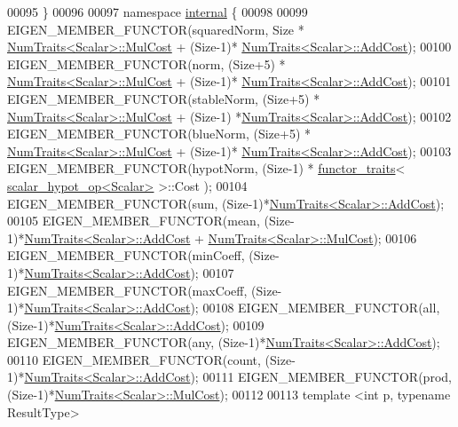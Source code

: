 \begin{DoxyCode}
00095 \textcolor{preprocessor}{  \}}
00096 
00097 \textcolor{keyword}{namespace }\hyperlink{namespaceinternal}{internal} \{
00098 
00099 EIGEN\_MEMBER\_FUNCTOR(squaredNorm, Size * \hyperlink{group___core___module_struct_eigen_1_1_num_traits}{NumTraits<Scalar>::MulCost} + (Size-1)*
      \hyperlink{group___core___module_struct_eigen_1_1_num_traits}{NumTraits<Scalar>::AddCost});
00100 EIGEN\_MEMBER\_FUNCTOR(norm, (Size+5) * \hyperlink{group___core___module_struct_eigen_1_1_num_traits}{NumTraits<Scalar>::MulCost} + (Size-1)*
      \hyperlink{group___core___module_struct_eigen_1_1_num_traits}{NumTraits<Scalar>::AddCost});
00101 EIGEN\_MEMBER\_FUNCTOR(stableNorm, (Size+5) * \hyperlink{group___core___module_struct_eigen_1_1_num_traits}{NumTraits<Scalar>::MulCost} + (Size-1)
      *\hyperlink{group___core___module_struct_eigen_1_1_num_traits}{NumTraits<Scalar>::AddCost});
00102 EIGEN\_MEMBER\_FUNCTOR(blueNorm, (Size+5) * \hyperlink{group___core___module_struct_eigen_1_1_num_traits}{NumTraits<Scalar>::MulCost} + (Size-1)*
      \hyperlink{group___core___module_struct_eigen_1_1_num_traits}{NumTraits<Scalar>::AddCost});
00103 EIGEN\_MEMBER\_FUNCTOR(hypotNorm, (Size-1) * \hyperlink{struct_eigen_1_1internal_1_1functor__traits}{functor\_traits}<
      \hyperlink{struct_eigen_1_1internal_1_1scalar__hypot__op}{scalar\_hypot\_op<Scalar>} >::Cost );
00104 EIGEN\_MEMBER\_FUNCTOR(sum, (Size-1)*\hyperlink{group___core___module_struct_eigen_1_1_num_traits}{NumTraits<Scalar>::AddCost});
00105 EIGEN\_MEMBER\_FUNCTOR(mean, (Size-1)*\hyperlink{group___core___module_struct_eigen_1_1_num_traits}{NumTraits<Scalar>::AddCost} + 
      \hyperlink{group___core___module_struct_eigen_1_1_num_traits}{NumTraits<Scalar>::MulCost});
00106 EIGEN\_MEMBER\_FUNCTOR(minCoeff, (Size-1)*\hyperlink{group___core___module_struct_eigen_1_1_num_traits}{NumTraits<Scalar>::AddCost});
00107 EIGEN\_MEMBER\_FUNCTOR(maxCoeff, (Size-1)*\hyperlink{group___core___module_struct_eigen_1_1_num_traits}{NumTraits<Scalar>::AddCost});
00108 EIGEN\_MEMBER\_FUNCTOR(all, (Size-1)*\hyperlink{group___core___module_struct_eigen_1_1_num_traits}{NumTraits<Scalar>::AddCost});
00109 EIGEN\_MEMBER\_FUNCTOR(any, (Size-1)*\hyperlink{group___core___module_struct_eigen_1_1_num_traits}{NumTraits<Scalar>::AddCost});
00110 EIGEN\_MEMBER\_FUNCTOR(count, (Size-1)*\hyperlink{group___core___module_struct_eigen_1_1_num_traits}{NumTraits<Scalar>::AddCost});
00111 EIGEN\_MEMBER\_FUNCTOR(prod, (Size-1)*\hyperlink{group___core___module_struct_eigen_1_1_num_traits}{NumTraits<Scalar>::MulCost});
00112 
00113 \textcolor{keyword}{template} <\textcolor{keywordtype}{int} p, \textcolor{keyword}{typename} ResultType>

\end{DoxyCode}
